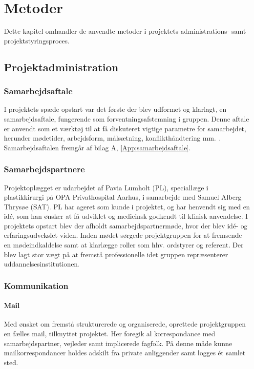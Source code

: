 \chapter{Metoder}

Dette kapitel omhandler de anvendte metoder i projektets administrations- samt projektstyringsproces. 

\section{Projektadministration}
\subsection{Samarbejdsaftale}
I projektets spæde opstart var det første der blev udformet og klarlagt, en samarbejdsaftale, fungerende som forventningsafstemning i gruppen. Denne aftale er anvendt som et værktøj til at få diskuteret vigtige parametre for samarbejdet, herunder mødetider, arbejdsform, målsætning, konflikthåndtering mm. \citep{RefWorks:12}. Samarbejdsaftalen fremgår af bilag A, \ref{App:samarbejdsaftale}. 

\subsection{Samarbejdspartnere}
	Projektoplægget er udarbejdet af Pavia Lumholt (PL), speciallæge i plastikkirurgi på OPA Privathospital Aarhus, i samarbejde med Samuel Alberg Thrysøe (SAT). PL har ageret som kunde i projektet, og har henvendt sig med en idé, som han ønsker at få udviklet og medicinsk godkendt til klinisk anvendelse. I projektets opstart blev der afholdt samarbejdspartnermøde, hvor der blev idé- og erfaringsudvekslet viden. Inden mødet sørgede projektgruppen for at fremsende en mødeindkaldelse samt at klarlægge roller som hhv. ordstyrer og referent. Der blev lagt stor vægt på at fremstå professionelle idet gruppen repræsenterer uddannelsesinstitutionen. 
	
	\subsection{Kommunikation}

	\subsubsection{Mail}
	Med ønsket om fremstå strukturerede og organiserede, oprettede projektgruppen en fælles mail, tilknyttet projektet. Her foregik al korrespondance med samarbejdspartner, vejleder samt implicerede fagfolk. På denne måde kunne mailkorrespondancer holdes adskilt fra private anliggender samt logges ét samlet sted. 
	
